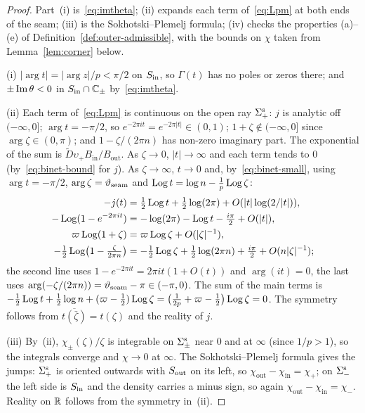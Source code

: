 \begin{proof}
Part~(i) is~\eqref{eq:imtheta}; (ii) expands each term of~\eqref{eq:Lpm} at both ends of the seam; (iii) is the
Sokhotski--Plemelj formula; (iv) checks the properties (a)--(e) of Definition~\ref{def:outer-admissible}, with the
bounds on $\chi$ taken from Lemma~\ref{lem:corner} below.

(i) $|\arg t|=|\arg z|/p<\pi/2$ on $S_{\mathrm{in}}$, so $\Gamma(t)$ has no poles or zeros there; and $\pm\operatorname{Im}\theta<0$ in
$S_{\mathrm{in}}\cap\mathbb{C}_\pm$ by~\eqref{eq:imtheta}.

(ii) Each term of~\eqref{eq:Lpm} is continuous on the open ray $\Sigma^{\mathrm{s}}_+$: $j$ is analytic off $(-\infty,0]$;
$\arg t=-\pi/2$, so $e^{-2\pi it}=e^{-2\pi|t|}\in(0,1)$; $1+\zeta\notin(-\infty,0]$ since $\arg\zeta\in(0,\pi)$; and
$1-\zeta/(2\pi n)$ has non-zero imaginary part. The exponential of the sum is $\tilde D\upsilon_+B_{\mathrm{in}}/B_{\mathrm{out}}$.
As $\zeta\to0$, $|t|\to\infty$ and each term tends to $0$ (by~\eqref{eq:binet-bound} for $j$). As $\zeta\to\infty$,
$t\to0$ and, by~\eqref{eq:binet-small}, using $\arg t=-\pi/2$, $\arg\zeta=\vartheta_{\mathrm{seam}}$ and $\operatorname{Log} t=\log n-\frac1p\operatorname{Log}\zeta$:
\begin{align*}
  -j(t)&=\tfrac12\operatorname{Log} t+\tfrac12\log(2\pi)+O(|t|\log(2/|t|)),\\
  -\operatorname{Log}(1-e^{-2\pi it})&=-\log(2\pi)-\operatorname{Log} t-\tfrac{i\pi}2+O(|t|),\\
  \varpi\operatorname{Log}(1+\zeta)&=\varpi\operatorname{Log}\zeta+O(|\zeta|^{-1}),\\
  -\tfrac12\operatorname{Log}\bigl(1-\tfrac\zeta{2\pi n}\bigr)&=-\tfrac12\operatorname{Log}\zeta+\tfrac12\log(2\pi n)+\tfrac{i\pi}2+O(n|\zeta|^{-1});
\end{align*}
the second line uses $1-e^{-2\pi it}=2\pi it(1+O(t))$ and $\arg(it)=0$, the last uses
$\arg(-\zeta/(2\pi n))=\vartheta_{\mathrm{seam}}-\pi\in(-\pi,0)$. The sum of the main terms is
$-\frac12\operatorname{Log} t+\frac12\log n+(\varpi-\frac12)\operatorname{Log}\zeta=\bigl(\frac1{2p}+\varpi-\frac12\bigr)\operatorname{Log}\zeta=0$. The symmetry
follows from $\overline{t(\bar\zeta)}=t(\zeta)$ and the reality of $j$.

(iii) By~(ii), $\chi_\pm(\zeta)/\zeta$ is integrable on $\Sigma^{\mathrm{s}}_\pm$ near $0$ and at $\infty$ (since $1/p>1$), so the
integrals converge and $\chi\to0$ at $\infty$. The Sokhotski--Plemelj formula gives the jumps: $\Sigma^{\mathrm{s}}_+$ is oriented
outwards with $S_{\mathrm{out}}$ on its left, so $\chi_{\mathrm{out}}-\chi_{\mathrm{in}}=\chi_+$; on $\Sigma^{\mathrm{s}}_-$ the left side is
$S_{\mathrm{in}}$ and the density carries a minus sign, so again $\chi_{\mathrm{out}}-\chi_{\mathrm{in}}=\chi_-$. Reality on $\mathbb{R}$
follows from the symmetry in~(ii).


\end{proof}
